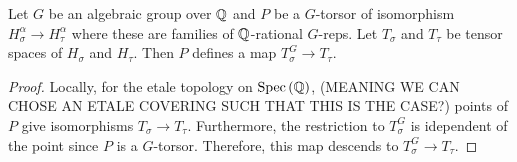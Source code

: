 \documentclass[12pt]{article}
\begin{document}
\begin{lemma}
Let $G$ be an algebraic group over $\mathbb{Q}$ and $P$ be a $G$-torsor of isomorphism $H^\alpha_\sigma \to H^\alpha_\tau$ where these are families of $\mathbb{Q}$-rational $G$-reps. Let $T_\sigma$ and $T_\tau$ be tensor spaces of $H_\sigma$ and $H_\tau$. Then $P$ defines a map $T_\sigma^G \to T_\tau$. 
\end{lemma}

\begin{proof}
Locally, for the etale topology on $\mathrm{Spec}\left( \mathbb{Q} \right)$, (MEANING WE CAN CHOSE AN ETALE COVERING SUCH THAT THIS IS THE CASE?) points of $P$ give isomorphisms $T_\sigma \to T_\tau$. Furthermore, the restriction to $T^G_\sigma$ is idependent of the point since $P$ is a $G$-torsor. Therefore, this map descends to $T^G_\sigma \to T_\tau$. 
\end{proof}
\end{document}
